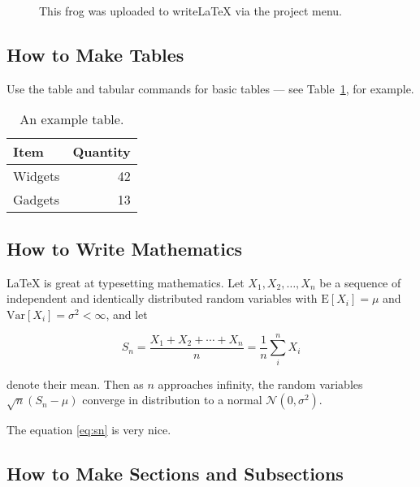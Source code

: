 \documentclass[a4paper]{article}
\begin{document}
      \begin{figure}
      \centering
      \caption{\label{fig:frog}This frog was uploaded to writeLaTeX via the project menu.}
      \end{figure}
      
      \subsection{How to Make Tables}
      
      Use the table and tabular commands for basic tables --- see Table~\ref{tab:widgets}, for example.
      
      \begin{table}
      \centering
      \begin{tabular}{l|r}
      Item & Quantity \\\hline
      Widgets & 42 \\
      Gadgets & 13
      \end{tabular}
      \caption{\label{tab:widgets}An example table.}
      \end{table}
      
      \subsection{How to Write Mathematics}
      
      \LaTeX{} is great at typesetting mathematics. Let $X_1, X_2, \ldots, X_n$ be a sequence of independent and identically distributed random variables with $\text{E}[X_i] = \mu$ and $\text{Var}[X_i] = \sigma^2 < \infty$, and let
      
      \begin{equation}
      S_n = \frac{X_1 + X_2 + \cdots + X_n}{n}
            = \frac{1}{n}\sum_{i}^{n} X_i
      \label{eq:sn}
      \end{equation}
      
      denote their mean. Then as $n$ approaches infinity, the random variables $\sqrt{n}(S_n - \mu)$ converge in distribution to a normal $\mathcal{N}(0, \sigma^2)$.
      
      The equation \ref{eq:sn} is very nice.
      
      \subsection{How to Make Sections and Subsections}
      
\end{document}
